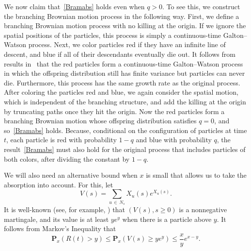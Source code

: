 \documentclass[10pt]{amsart}
\theoremstyle{definition}\newtheorem{defi}[theo]{Definition}\newtheorem{rema}[theo]{Remark}\newtheorem{exam}[theo]{Example}\newtheorem{exem}[theo]{Example}\newtheorem{nota}[theo]{Notation}
\renewcommand*\P{\mathbf{P}}
\newcommand{\1} {\mathds{1}}
\begin{document}
We now claim that~\eqref{Bramabs} holds even when $q > 0$. To see this, we construct the branching Brownian motion process in the following way. First, we define a branching Brownian motion process with no killing at the origin. If we ignore the spatial positions of the particles, this process is simply a continuous-time Galton--Watson process. Next, we color particles red if they have an infinite line of descent, and blue if all of their descendants eventually die out. It follows from results in~\cite{gr} that the red particles form a continuous-time Galton--Watson process in which the offspring distribution still has finite variance but particles can never die. Furthermore, this process has the same growth rate as the original process. After coloring the particles red and blue, we again consider the spatial motion, which is independent of the branching structure, and add the killing at the origin by truncating paths once they hit the origin. Now the red particles form a branching Brownian motion whose offspring distribution satisfies $q = 0$, and so~\eqref{Bramabs} holds. Because, conditional on the configuration of particles at time $t$, each particle is red with probability $1-q$ and blue with probability $q$, the result~\eqref{Bramabs} must also hold for the original process that includes particles of both colors, after dividing the constant by $1 - q$.

We will also need an alternative bound when $x$ is small that allows us to take the absorption into account. For this, let
\[
V(s) = \sum_{u\,\in\,N_s} X_u(s) e^{X_u(s)}.
\]
It is well-known (see, for example, \cite[Lemma~2]{hh07}) that $(V(s), s \geq 0)$ is a nonnegative martingale, and its value is at least $ye^y$ when there is a particle above $y$. It follows from Markov's Inequality that
\begin{equation}\label{derMG}
\P_x(R(t) > y) \leq \P_x\left(V(s) \ge ye^y\right) \leq \frac{x}{y} e^{x - y}.
\end{equation}
\end{document}
